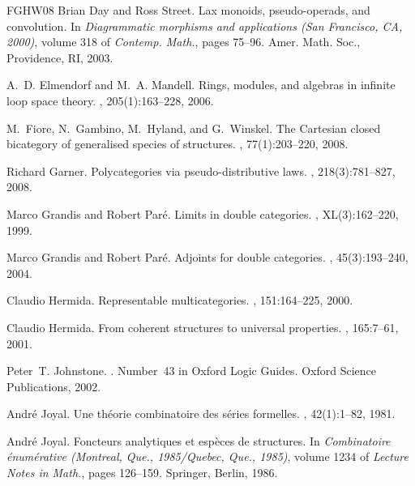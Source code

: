 \documentclass{tac}
\numberwithin{equation}{section}
\begin{document}
\begin{thebibliography}{FGHW08}
Brian Day and Ross Street.
\newblock Lax monoids, pseudo-operads, and convolution.
\newblock In {\em Diagrammatic morphisms and applications ({S}an {F}rancisco,
  {CA}, 2000)}, volume 318 of {\em Contemp. Math.}, pages 75--96. Amer. Math.
  Soc., Providence, RI, 2003.

A.~D. Elmendorf and M.~A. Mandell.
\newblock Rings, modules, and algebras in infinite loop space theory.
, 205(1):163--228, 2006.

M.~Fiore, N.~Gambino, M.~Hyland, and G.~Winskel.
\newblock The {C}artesian closed bicategory of generalised species of
  structures.
, 77(1):203--220, 2008.

Richard Garner.
\newblock Polycategories via pseudo-distributive laws.
, 218(3):781--827, 2008.

Marco Grandis and Robert Par{\'e}.
\newblock Limits in double categories.
,
  XL(3):162--220, 1999.

Marco Grandis and Robert Par{\'e}.
\newblock Adjoints for double categories.
, 45(3):193--240, 2004.

Claudio Hermida.
\newblock Representable multicategories.
, 151:164--225, 2000.

Claudio Hermida.
\newblock From coherent structures to universal properties.
, 165:7--61, 2001.

Peter~T. Johnstone.
.
\newblock Number~43 in Oxford Logic Guides. Oxford Science Publications, 2002.

Andr{\'e} Joyal.
\newblock Une th\'eorie combinatoire des s\'eries formelles.
, 42(1):1--82, 1981.

Andr{\'e} Joyal.
\newblock Foncteurs analytiques et esp\`eces de structures.
\newblock In {\em Combinatoire \'enum\'erative ({M}ontreal, {Q}ue.,
  1985/{Q}uebec, {Q}ue., 1985)}, volume 1234 of {\em Lecture Notes in Math.},
  pages 126--159. Springer, Berlin, 1986.


\end{thebibliography}
\end{document}
